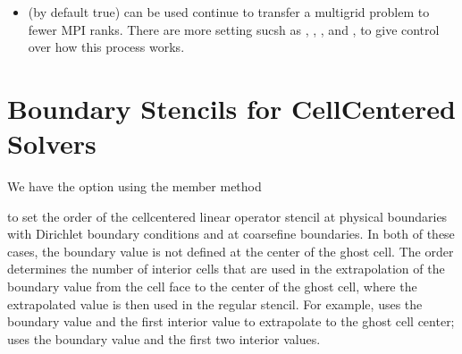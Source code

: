 \documentclass[letterpaper,10pt,english]{sphinxmanual}
\begin{document}
\begin{itemize}
\item {} 
\sphinxAtStartPar
{} (by default true) can be used
continue to transfer a multigrid problem to fewer MPI ranks.
There are more setting sucsh as ,
, , and
, to give control over how this process works.

\end{itemize}


\section{Boundary Stencils for Cell\sphinxhyphen{}Centered Solvers}
\label{\detokenize{LinearSolvers:boundary-stencils-for-cell-centered-solvers}}
\sphinxAtStartPar
We have the option using the  member method

\begin{sphinxVerbatim}[commandchars=\\\{\}]
   
\end{sphinxVerbatim}

\sphinxAtStartPar
to set the order of the cell\sphinxhyphen{}centered linear operator stencil at physical boundaries
with Dirichlet boundary conditions and at coarse\sphinxhyphen{}fine boundaries.  In both of these
cases, the boundary value is not defined at the center of the ghost cell.
The order determines the number of interior cells that are used in the extrapolation
of the boundary value from the cell face to the center of the ghost cell, where
the extrapolated value is then used in the regular stencil.  For example,
 uses the boundary value and the first interior value to extrapolate
to the ghost cell center;  uses the boundary value and the first two interior values.
\end{document}
